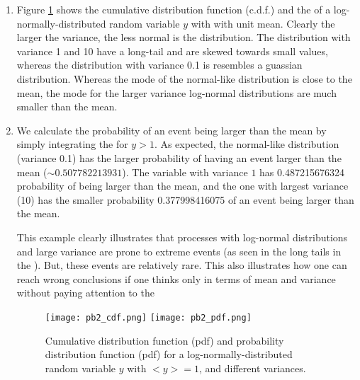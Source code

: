 \documentclass[11pt]{article}
\begin{document}
\begin{enumerate}[label=(\alph*)]
        \item Figure \ref{fig:pb2} shows the cumulative distribution function (c.d.f.) and the \pdf of a log-normally-distributed random variable $y$ with with unit mean. Clearly the larger the variance, the less normal is the distribution. The distribution with variance 1 and 10 have a long-tail and are skewed towards small values, whereas the distribution with variance 0.1 is resembles a guassian distribution. Whereas the mode of the normal-like distribution is close to the mean, the mode for the larger variance log-normal distributions are much smaller than the mean.
        \item  We calculate the probability of an event being larger than the mean by simply integrating the \pdf  for $y>1$. As expected, the normal-like distribution (variance 0.1) has the larger probability of having an event larger than the mean ($\sim0.507782213931$). The variable with variance $1$ has 0.487215676324 probability of being larger than the mean, and the one with largest variance (10) has the smaller probability 0.377998416075 of an event being larger than the mean. 

            This example clearly illustrates that processes with log-normal distributions and large variance are prone to extreme events (as seen in the long tails in the \pdf). But, these events are relatively rare. This also illustrates how one can reach wrong conclusions if one thinks only in terms of mean and variance without paying attention to the \pdf
        \begin{figure}[ht]
        \begin{center}
        \texttt{[image: pb2\_cdf.png]}
        \texttt{[image: pb2\_pdf.png]}
        \end{center}
        \caption{Cumulative distribution function (pdf) and probability distribution function (pdf) 
                for a log-normally-distributed random variable $y$ with $<y>=1$, and different variances.}
        \label{fig:pb2}
        \end{figure}


\end{enumerate}
\end{document}
